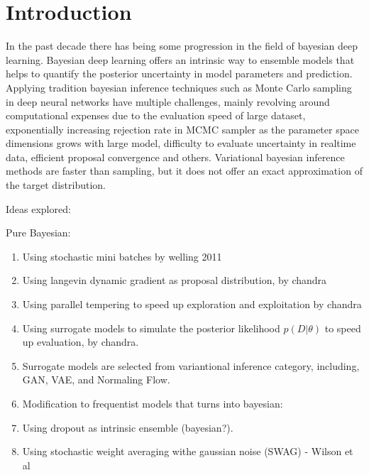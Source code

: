 \documentclass[honours,12pt]{unswthesis}
\newcommand\blankpage{%
    \null
    \thispagestyle{empty}%
    \addtocounter{page}{-1}%
    \newpage}
\numberwithin{equation}{section}
\begin{document}
\afterpage{\blankpage}


\afterpreface

%
%

\afterpage{\blankpage}

\chapter{Introduction}\label{intro}

In the past decade there has being some progression in the field of bayesian deep learning. Bayesian deep learning offers an intrinsic way to ensemble models that helps to quantify the posterior uncertainty in model parameters and prediction. Applying tradition bayesian inference techniques such as Monte Carlo sampling in deep neural networks have multiple challenges, mainly revolving around computational expenses due to the evaluation speed of large dataset, exponentially increasing rejection rate in MCMC sampler as the parameter space dimensions grows with large model, difficulty to evaluate uncertainty in realtime data, efficient proposal convergence and others. Variational bayesian inference methods are faster than sampling, but it does not offer an exact approximation of the target distribution. 



\noindent Ideas explored: 

Pure Bayesian:

\begin{enumerate}
\item Using stochastic mini batches by welling 2011

\item Using langevin dynamic gradient as proposal distribution, by chandra 

\item Using parallel tempering to speed up exploration and exploitation by chandra \cite{LDPTBNN}

\item Using surrogate models to simulate the posterior likelihood $p(D|\theta)$ to speed up evaluation, by chandra. \cite{SAPTBNN}

\item Surrogate models are selected from variantional inference category, including, GAN, VAE, and Normaling Flow.

\item Modification to frequentist models that turns into bayesian:

\item Using dropout as intrinsic ensemble (bayesian?).

\item Using stochastic weight averaging withe gaussian noise (SWAG) - Wilson et al
\end{enumerate}
\end{document}
